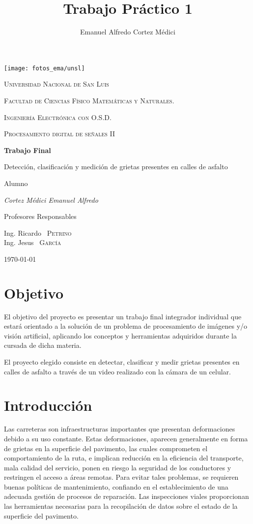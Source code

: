 \documentclass[11pt,a4paper]{article}
\author{Emanuel Alfredo Cortez Médici}
\title{Trabajo Práctico 1}
\begin{document}
	\begin{titlepage}
	\centering
	
	\texttt{[image: fotos\_ema/unsl]} 
	
	{\scshape\LARGE Universidad Nacional de San Luis\par}
	{\scshape Facultad de Ciencias Físico Matemáticas y Naturales.\par}
	{\scshape Ingeniería Electrónica con O.S.D.\par}
	\vspace{1.5cm}
	{\scshape\Large Procesamiento digital de señales II \par}
	\vspace{1.5cm}
	{\huge\bfseries Trabajo Final

	Detección, clasificación y medición de grietas presentes en calles
	de asfalto
	\par}
	\vspace{2cm}
	Alumno\par
	{\Large\itshape Cortez Médici Emanuel Alfredo\par}
	\vfill
	Profesores Responsables\par
	Ing. Ricardo ~\textsc{Petrino}\\
	Ing. Jesus ~\textsc{García}
	
	\vfill

	{\large \today\par}
\end{titlepage}

\newpage

\section{Objetivo}
El objetivo del proyecto es presentar un trabajo final integrador individual que estará orientado a la solución de un problema de procesamiento de imágenes y/o visión artificial, aplicando los conceptos y herramientas adquiridos durante la cursada de dicha materia.

El proyecto elegido consiste en detectar, clasificar y medir grietas presentes en calles de asfalto a través de un video realizado con la cámara de un celular.

\section{Introducción}

Las carreteras son infraestructuras importantes que presentan deformaciones debido a su uso constante. 
Estas deformaciones, aparecen generalmente en forma de grietas en la superficie del pavimento, las cuales comprometen el comportamiento de la ruta, e implican reducción en la eficiencia del transporte, mala calidad del servicio, ponen en riesgo la seguridad de los conductores y restringen el acceso a áreas remotas. 
Para evitar tales problemas, se requieren buenas políticas de mantenimiento, confiando en el establecimiento de una adecuada gestión de procesos de reparación.
Las inspecciones viales proporcionan las herramientas necesarias para la recopilación de datos sobre el estado de la superficie del pavimento. 
\end{document}
